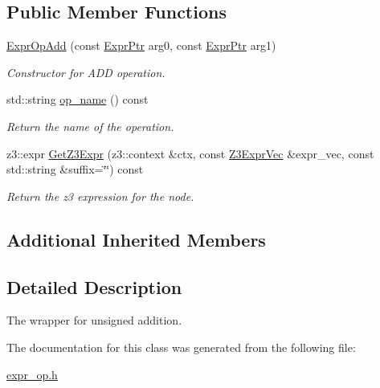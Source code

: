 \subsection*{Public Member Functions}
\begin{DoxyCompactItemize}
\item 
\mbox{\label{classilang_1_1_expr_op_add_af6d91ca8cb832a40a102db5b83a4456f}} 
\mbox{\hyperlink{classilang_1_1_expr_op_add_af6d91ca8cb832a40a102db5b83a4456f}{Expr\+Op\+Add}} (const \mbox{\hyperlink{classilang_1_1_expr_a85952b6a34620c4c8cab6bac9c9fdf8c}{Expr\+Ptr}} arg0, const \mbox{\hyperlink{classilang_1_1_expr_a85952b6a34620c4c8cab6bac9c9fdf8c}{Expr\+Ptr}} arg1)
\begin{DoxyCompactList}\small\item\em Constructor for A\+DD operation. \end{DoxyCompactList}\item 
\mbox{\label{classilang_1_1_expr_op_add_adabd330bb348006fd05b4265d9c4b70d}} 
std\+::string \mbox{\hyperlink{classilang_1_1_expr_op_add_adabd330bb348006fd05b4265d9c4b70d}{op\+\_\+name}} () const
\begin{DoxyCompactList}\small\item\em Return the name of the operation. \end{DoxyCompactList}\item 
\mbox{\label{classilang_1_1_expr_op_add_a10544b6520c6a844a1cffb53cc3d6e09}} 
z3\+::expr \mbox{\hyperlink{classilang_1_1_expr_op_add_a10544b6520c6a844a1cffb53cc3d6e09}{Get\+Z3\+Expr}} (z3\+::context \&ctx, const \mbox{\hyperlink{namespaceilang_adc4eee919aa24fff882d03a48d733c19}{Z3\+Expr\+Vec}} \&expr\+\_\+vec, const std\+::string \&suffix=\char`\"{}\char`\"{}) const
\begin{DoxyCompactList}\small\item\em Return the z3 expression for the node. \end{DoxyCompactList}\end{DoxyCompactItemize}
\subsection*{Additional Inherited Members}


\subsection{Detailed Description}
The wrapper for unsigned addition. 

The documentation for this class was generated from the following file\+:\begin{DoxyCompactItemize}
\item 
\mbox{\hyperlink{expr__op_8h}{expr\+\_\+op.\+h}}\end{DoxyCompactItemize}
